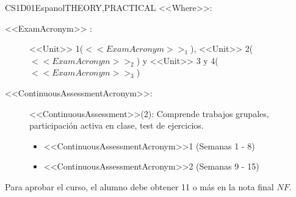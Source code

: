 \begin{evaluation}{CS1D01}{Espanol}{THEORY,PRACTICAL}
  \vspace{2mm}
  \noindent <<Where>>:
  \begin{description}
    \item[<<ExamAcronym>> :] <<Unit>> 1($<<ExamAcronym>>_{1}$), <<Unit>> 2($<<ExamAcronym>>_{2}$) y <<Unit>> 3 y 4($<<ExamAcronym>>_{3}$) 
      \item[<<ContinuousAssessmentAcronym>>:]<<ContinuousAssessment>>(2): Comprende trabajos grupales, participación activa en clase, test de ejercicios.
      \begin{itemize}
            \item <<ContinuousAssessmentAcronym>>1 (Semanas 1 - 8) 
            \item <<ContinuousAssessmentAcronym>>2 (Semanas 9 - 15)
      \end{itemize}
  \end{description}
 
  \noindent Para aprobar el curso, el alumno debe obtener 11 o más en la nota final $NF$.
  \end{evaluation}
 
